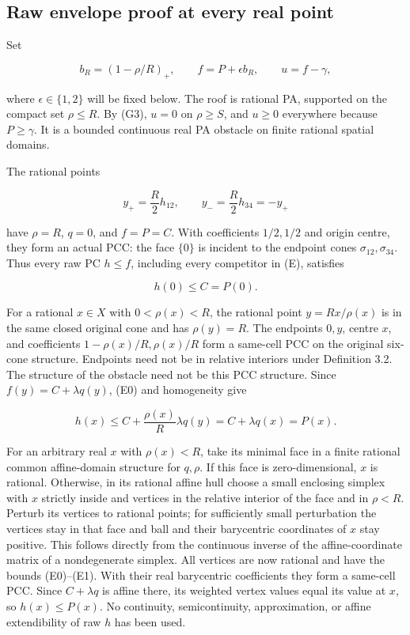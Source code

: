 \documentclass[
  10pt,
]{article}
\begin{document}
\subsection{Raw envelope proof at every real
point}\label{raw-envelope-proof-at-every-real-point}

Set

\[
b_R=(1-\rho/R)_+,\qquad f=P+\epsilon b_R,\qquad u=f-\gamma, \tag{O}
\]

where \(\epsilon\in\{1,2\}\) will be fixed below. The roof is rational
PA, supported on the compact set \(\rho\leq R\). By (G3), \(u=0\) on
\(\rho\geq S\), and \(u\geq0\) everywhere because \(P\geq\gamma\). It is
a bounded continuous real PA obstacle on finite rational spatial
domains.

The rational points

\[
y_+=\frac R2 h_{12},\qquad y_-=\frac R2 h_{34}=-y_+
\]

have \(\rho=R\), \(q=0\), and \(f=P=C\). With coefficients \(1/2,1/2\)
and origin centre, they form an actual PCC: the face \(\{0\}\) is
incident to the endpoint cones \(\sigma_{12},\sigma_{34}\). Thus every
raw PC \(h\leq f\), including every competitor in (E), satisfies

\[
h(0)\leq C=P(0). \tag{E0}
\]

For a rational \(x\in X\) with \(0<\rho(x)<R\), the rational point
\(y=Rx/\rho(x)\) is in the same closed original cone and has
\(\rho(y)=R\). The endpoints \(0,y\), centre \(x\), and coefficients
\(1-\rho(x)/R,\rho(x)/R\) form a same-cell PCC on the original six-cone
structure. Endpoints need not be in relative interiors under Definition
3.2. The structure of the obstacle need not be this PCC structure. Since
\(f(y)=C+\lambda q(y)\), (E0) and homogeneity give

\[
h(x)\leq C+\frac{\rho(x)}R\lambda q(y)
=C+\lambda q(x)=P(x). \tag{E1}
\]

For an arbitrary real \(x\) with \(\rho(x)<R\), take its minimal face in
a finite rational common affine-domain structure for \(q,\rho\). If this
face is zero-dimensional, \(x\) is rational. Otherwise, in its rational
affine hull choose a small enclosing simplex with \(x\) strictly inside
and vertices in the relative interior of the face and in \(\rho<R\).
Perturb its vertices to rational points; for sufficiently small
perturbation the vertices stay in that face and ball and their
barycentric coordinates of \(x\) stay positive. This follows directly
from the continuous inverse of the affine-coordinate matrix of a
nondegenerate simplex. All vertices are now rational and have the bounds
(E0)--(E1). With their real barycentric coefficients they form a
same-cell PCC. Since \(C+\lambda q\) is affine there, its weighted
vertex values equal its value at \(x\), so \(h(x)\leq P(x)\). No
continuity, semicontinuity, approximation, or affine extendibility of
raw \(h\) has been used.
\end{document}
